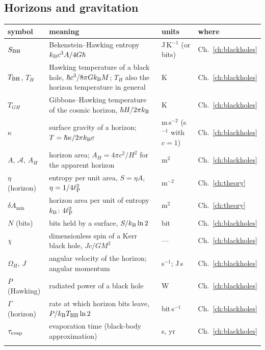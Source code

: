 \subsection*{Horizons and gravitation}
{\small\begin{longtable}{@{}>{\raggedright\arraybackslash}p{}>{\raggedright\arraybackslash}p{}>{\raggedright\arraybackslash}p{}>{\raggedright\arraybackslash}p{}@{}}
\toprule symbol & meaning & units & where\\\midrule\endhead
$S_{\rm BH}$ & Bekenstein--Hawking entropy $k_{\mathrm B} c^3A/4G\hbar$ & J\,K$^{-1}$ (or bits) & Ch.~\ref{ch:blackholes}\\\iamrowrule
$T_{\rm BH}$, $T_H$ & Hawking temperature of a black hole, $\hbar c^3/8\pi Gk_{\mathrm B} M$; $T_H$ also the horizon temperature in general & K & Ch.~\ref{ch:blackholes}\\\iamrowrule
$T_{GH}$ & Gibbons--Hawking temperature of the cosmic horizon, $\hbar H/2\pi k_{\mathrm B}$ & K & Ch.~\ref{ch:blackholes}\\\iamrowrule
$\kappa$ & surface gravity of a horizon; $T=\hbar\kappa/2\pi k_{\mathrm B} c$ & m\,s$^{-2}$ (s$^{-1}$ with $c=1$) & Ch.~\ref{ch:blackholes}\\\iamrowrule
$A$, $\mathcal A$, $A_H$ & horizon area; $A_H=4\pi c^2/H^2$ for the apparent horizon & m$^2$ & Ch.~\ref{ch:blackholes}\\\iamrowrule
$\eta$ (horizon) & entropy per unit area, $S=\eta A$, $\eta=1/4\ell_{\mathrm P}^2$ & m$^{-2}$ & Ch.~\ref{ch:theory}\\\iamrowrule
$\delta A_{\min}$ & horizon area per unit of entropy $k_{\mathrm B}$: $4\ell_{\mathrm P}^2$ & m$^2$ & Ch.~\ref{ch:theory}\\\iamrowrule
$N$ (bits) & bits held by a surface, $S/k_{\mathrm B}\ln2$ & bit & Ch.~\ref{ch:blackholes}\\\iamrowrule
$\chi$ & dimensionless spin of a Kerr black hole, $Jc/GM^2$ & --- & Ch.~\ref{ch:blackholes}\\\iamrowrule
$\Omega_H$, $J$ & angular velocity of the horizon; angular momentum & s$^{-1}$; J\,s & Ch.~\ref{ch:blackholes}\\\iamrowrule
$P$ (Hawking) & radiated power of a black hole & W & Ch.~\ref{ch:blackholes}\\\iamrowrule
$\Gamma$ (horizon) & rate at which horizon bits leave, $P/k_{\mathrm B} T_{\rm BH}\ln2$ & bit\,s$^{-1}$ & Ch.~\ref{ch:blackholes}\\\iamrowrule
$\tau_{\rm evap}$ & evaporation time (black-body approximation) & s, yr & Ch.~\ref{ch:blackholes}\\\iamrowrule

\end{longtable}}
